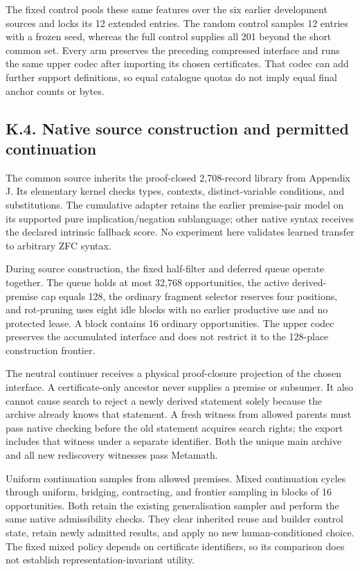 \documentclass[pdflatex,sn-basic,Numbered]{sn-jnl}
\begin{document}
The fixed control pools these same features over the six earlier development sources and locks its 12 extended entries. The random control samples 12 entries with a frozen seed, whereas the full control supplies all 201 beyond the short common set. Every arm preserves the preceding compressed interface and runs the same upper codec after importing its chosen certificates. That codec can add further support definitions, so equal catalogue quotas do not imply equal final anchor counts or bytes.

\subsection*{K.4. Native source construction and permitted continuation}\label{k.4.-native-source-construction-and-permitted-continuation}

The common source inherits the proof-closed 2,708-record library from Appendix J. Its elementary kernel checks types, contexts, distinct-variable conditions, and substitutions. The cumulative adapter retains the earlier premise-pair model on its supported pure implication/negation sublanguage; other native syntax receives the declared intrinsic fallback score. No experiment here validates learned transfer to arbitrary ZFC syntax.

During source construction, the fixed half-filter and deferred queue operate together. The queue holds at most 32,768 opportunities, the active derived-premise cap equals 128, the ordinary fragment selector reserves four positions, and rot-pruning uses eight idle blocks with no earlier productive use and no protected lease. A block contains 16 ordinary opportunities. The upper codec preserves the accumulated interface and does not restrict it to the 128-place construction frontier.

The neutral continuer receives a physical proof-closure projection of the chosen interface. A certificate-only ancestor never supplies a premise or subsumer. It also cannot cause search to reject a newly derived statement solely because the archive already knows that statement. A fresh witness from allowed parents must pass native checking before the old statement acquires search rights; the export includes that witness under a separate identifier. Both the unique main archive and all new rediscovery witnesses pass Metamath.

Uniform continuation samples from allowed premises. Mixed continuation cycles through uniform, bridging, contracting, and frontier sampling in blocks of 16 opportunities. Both retain the existing generalisation sampler and perform the same native admissibility checks. They clear inherited reuse and builder control state, retain newly admitted results, and apply no new human-conditioned choice. The fixed mixed policy depends on certificate identifiers, so its comparison does not establish representation-invariant utility.
\end{document}
